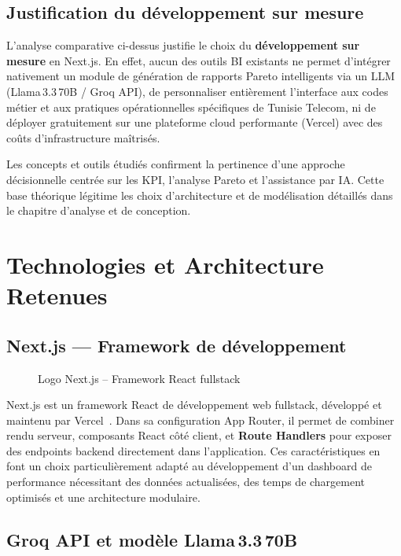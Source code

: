 \documentclass[10pt,a4paper]{report}
\newcommand{\chapconclusion}[1]{%
  \vspace{8pt}%
  \begin{tcolorbox}[conclusionbox]
    #1
  \end{tcolorbox}%
}
\begin{document}
\subsection{Justification du développement sur mesure}

L'analyse comparative ci-dessus justifie le choix du \textbf{développement sur mesure} en Next.js. En effet, aucun des outils BI existants ne permet d'intégrer nativement un module de génération de rapports Pareto intelligents via un LLM (Llama\,3.3\,70B / Groq API), de personnaliser entièrement l'interface aux codes métier et aux pratiques opérationnelles spécifiques de Tunisie Telecom, ni de déployer gratuitement sur une plateforme cloud performante (Vercel) avec des coûts d'infrastructure maîtrisés.

\chapconclusion{%
Les concepts et outils étudiés confirment la pertinence d'une approche décisionnelle centrée sur les KPI, l'analyse Pareto et l'assistance par IA. Cette base théorique légitime les choix d'architecture et de modélisation détaillés dans le chapitre d'analyse et de conception.%
}

\section{Technologies et Architecture Retenues}

\subsection{Next.js --- Framework de développement}

\begin{figure}[H]
\centering
\caption{Logo Next.js -- Framework React fullstack}
\label{fig:nextjs-logo}
\end{figure}

Next.js est un framework React de développement web fullstack, développé et maintenu par Vercel~\cite{nextjs2025}. Dans sa configuration App Router, il permet de combiner rendu serveur, composants React côté client, et \textbf{Route Handlers} pour exposer des endpoints backend directement dans l'application. Ces caractéristiques en font un choix particulièrement adapté au développement d'un dashboard de performance nécessitant des données actualisées, des temps de chargement optimisés et une architecture modulaire.

\subsection{Groq API et modèle Llama\,3.3\,70B}
\end{document}
